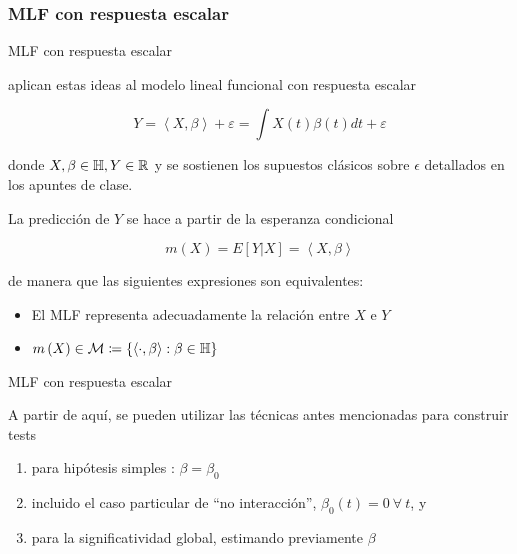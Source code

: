 \documentclass[10pt,spanish,handout]{beamer}\usepackage[]{graphicx}\usepackage[]{color}
\begin{document}
\subsubsection{MLF con respuesta escalar}
\begin{frame}{MLF con respuesta escalar}

\cite{Garcia 2014,Cuesta 2019} aplican estas ideas al modelo lineal
funcional con respuesta escalar

\[
Y=\left\langle X,\beta\right\rangle +\varepsilon=\int X\left(t\right)\beta\left(t\right)dt+\varepsilon
\]

donde $X,\beta\in\mathbb{H},Y\in\mathbb{R}$ y se sostienen los supuestos
clásicos sobre $\epsilon$ detallados en los apuntes de clase.

\pause{}

La predicción de $Y$ se hace a partir de la esperanza condicional

\[
m\left(X\right)=E\left[Y|X\right]=\left\langle X,\beta\right\rangle 
\]


\pause{}

de manera que las siguientes expresiones son equivalentes:
\begin{itemize}
\item El MLF representa adecuadamente la relación entre $X$ e $Y$
\item $m\left(X\right)\in\mathcal{M}\coloneqq\left\{ \left\langle \cdot,\beta\right\rangle :\beta\in\mathbb{H}\right\} $
\end{itemize}
\end{frame}
%
\begin{frame}{MLF con respuesta escalar}

A partir de aquí, se pueden utilizar las técnicas antes mencionadas
para construir tests
\begin{enumerate}[<+->]
\item para hipótesis simples : $\beta=\beta_{0}$
\item incluido el caso particular de “no interacción”, $\beta_{0}\left(t\right)=0\ \forall\ t$,
y
\item para la significatividad global, estimando previamente $\beta$ 
\end{enumerate}
\end{frame}
%
\end{document}
